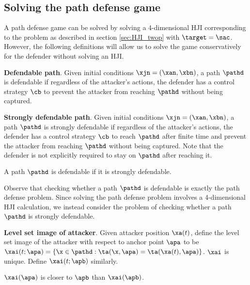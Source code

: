 \subsection{Solving the path defense game}
A path defense game can be solved by solving a 4-dimensional HJI corresponding to the problem as described in section \ref{sec:HJI_twop} with $\target=\sac$. However, the following definitions will allow us to solve the game conservatively for the defender without solving an HJI.

\begin{defn} %
\textbf{Defendable path}. Given initial conditions $\xjn=(\xan,\xbn)$, a path $\pathd$ is defendable if regardless of the attacker's actions, the defender has a control strategy $\cb$ to prevent the attacker from reaching $\pathd$ without being captured.
\end{defn}

\begin{defn} %
\textbf{Strongly defendable path}. Given initial conditions $\xjn=(\xan,\xbn)$, a path $\pathd$ is strongly defendable if regardless of the attacker's actions, the defender has a control strategy $\cb$ to reach $\pathd$ after finite time and prevent the attacker from reaching $\pathd$ without being captured. Note that the defender is not explicitly required to stay on $\pathd$ after reaching it.
\end{defn}

\begin{rem}
A path $\pathd$ is defendable if it is strongly defendable.
\end{rem}

Observe that checking whether a path $\pathd$ is defendable is exactly the path defense problem. Since solving the path defense problem involves a 4-dimensional HJI calculation, we instead consider the problem of checking whether a path $\pathd$ is strongly defendable.

\begin{defn} %
\textbf{Level set image of attacker}. Given attacker position $\xa(t)$, define the level set image of the attacker with respect to anchor point $\apa$ to be $\xai(t;\apa) = \{\x\in\pathd: \ta(\x,\apa) = \ta(\xa(t),\apa)\}$. $\xai$ is unique. Define $\xai(t;\apb)$ similarly.
\end{defn}

\begin{rem}
\label{rem:image_of_a}
$\xai(\apa)$ is closer to $\apb$ than $\xai(\apb)$.
\end{rem}

